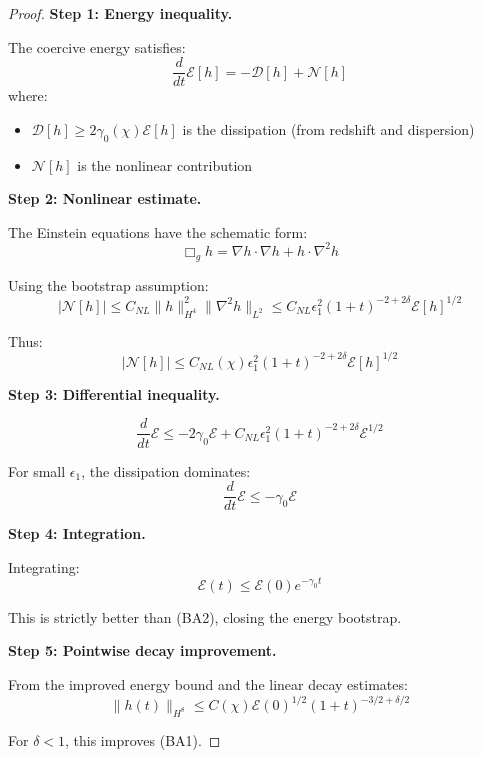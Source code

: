 \documentclass[12pt,a4paper]{article}
\begin{document}
\begin{proof}
\textbf{Step 1: Energy inequality.}

The coercive energy satisfies:
\begin{equation}
\frac{d}{dt}\mathcal{E}[h] = -\mathcal{D}[h] + \mathcal{N}[h]
\end{equation}
where:
\begin{itemize}
    \item $\mathcal{D}[h] \geq 2\gamma_0(\chi)\mathcal{E}[h]$ is the dissipation (from redshift and dispersion)
    \item $\mathcal{N}[h]$ is the nonlinear contribution
\end{itemize}

\textbf{Step 2: Nonlinear estimate.}

The Einstein equations have the schematic form:
\begin{equation}
\Box_g h = \nabla h \cdot \nabla h + h \cdot \nabla^2 h
\end{equation}

Using the bootstrap assumption:
\begin{equation}
|\mathcal{N}[h]| \leq C_{NL} \|h\|_{H^4}^2 \|\nabla^2 h\|_{L^2} \leq C_{NL} \epsilon_1^2 (1+t)^{-2+2\delta} \mathcal{E}[h]^{1/2}
\end{equation}

Thus:
\begin{equation}
|\mathcal{N}[h]| \leq C_{NL}(\chi) \epsilon_1^2 (1+t)^{-2+2\delta} \mathcal{E}[h]^{1/2}
\end{equation}

\textbf{Step 3: Differential inequality.}

\begin{equation}
\frac{d}{dt}\mathcal{E} \leq -2\gamma_0 \mathcal{E} + C_{NL}\epsilon_1^2 (1+t)^{-2+2\delta}\mathcal{E}^{1/2}
\end{equation}

For small $\epsilon_1$, the dissipation dominates:
\begin{equation}
\frac{d}{dt}\mathcal{E} \leq -\gamma_0 \mathcal{E}
\end{equation}

\textbf{Step 4: Integration.}

Integrating:
\begin{equation}
\mathcal{E}(t) \leq \mathcal{E}(0) e^{-\gamma_0 t}
\end{equation}

This is strictly better than (BA2), closing the energy bootstrap.

\textbf{Step 5: Pointwise decay improvement.}

From the improved energy bound and the linear decay estimates:
\begin{equation}
\|h(t)\|_{H^8} \leq C(\chi)\mathcal{E}(0)^{1/2}(1+t)^{-3/2+\delta/2}
\end{equation}

For $\delta < 1$, this improves (BA1).
\end{proof}
\end{document}
